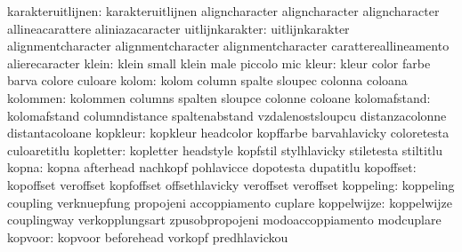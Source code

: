         karakteruitlijnen: karakteruitlijnen         aligncharacter
                           aligncharacter            aligncharacter
                           allineacarattere          aliniazacaracter %
          uitlijnkarakter: uitlijnkarakter           alignmentcharacter
                           alignmentcharacter        alignmentcharacter
                           carattereallineamento     alierecaracter %
                    klein: klein                     small
                           klein                     male
                           piccolo                   mic
                    kleur: kleur                     color
                           farbe                     barva
                           colore                    culoare
                    kolom: kolom                     column
                           spalte                    sloupec
                           colonna                   coloana
                 kolommen: kolommen                  columns
                           spalten                   sloupce
                           colonne                   coloane
             kolomafstand: kolomafstand              columndistance
                           spaltenabstand            vzdalenostsloupcu
                           distanzacolonne           distantacoloane
                 kopkleur: kopkleur                  headcolor
                           kopffarbe                 barvahlavicky
                           coloretesta               culoaretitlu
                kopletter: kopletter                 headstyle
                           kopfstil                  stylhlavicky
                           stiletesta                stiltitlu
                    kopna: kopna                     afterhead
                           nachkopf                  pohlavicce
                           dopotesta                 dupatitlu
                kopoffset: kopoffset                 veroffset
                           kopfoffset                offsethlavicky
                           veroffset                 veroffset %
                koppeling: koppeling                 coupling
                           verknuepfung              propojeni
                           accoppiamento             cuplare
              koppelwijze: koppelwijze               couplingway
                           verkopplungsart           zpusobpropojeni
                           modoaccoppiamento         modcuplare
                  kopvoor: kopvoor                   beforehead
                           vorkopf                   predhlavickou
